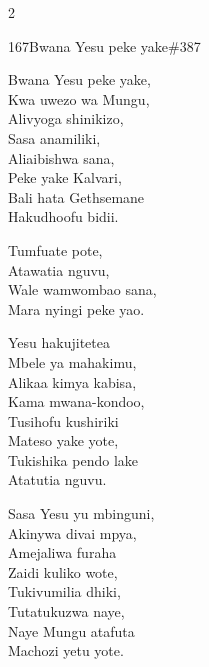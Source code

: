 \documentclass{article}
\begin{document}
\begin{multicols}{2}
\begin{hymn}{167}{Bwana Yesu peke yake}{\#387}
\begin{stanza}
Bwana Yesu peke yake,\\
Kwa uwezo wa Mungu,\\
Alivyoga shinikizo,\\
Sasa anamiliki,\\
Aliaibishwa sana,\\
Peke yake Kalvari,\\
Bali hata Gethsemane\\
Hakudhoofu bidii.
\end{stanza}
\begin{chorus}
Tumfuate pote,\\
Atawatia nguvu,\\
Wale wamwombao sana,\\
Mara nyingi peke yao.
\end{chorus}
\begin{stanza}
Yesu hakujitetea\\
Mbele ya mahakimu,\\
Alikaa kimya kabisa,\\
Kama mwana-kondoo,\\
Tusihofu kushiriki\\
Mateso yake yote,\\
Tukishika pendo lake\\
Atatutia nguvu.
\end{stanza}
\begin{stanza}
Sasa Yesu yu mbinguni,\\
Akinywa divai mpya,\\
Amejaliwa furaha\\
Zaidi kuliko wote,\\
Tukivumilia dhiki,\\
Tutatukuzwa naye,\\
Naye Mungu atafuta\\
Machozi yetu yote.
\end{stanza}
\end{hymn}


\end{multicols}
\end{document}
